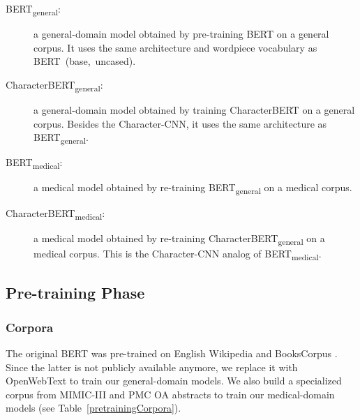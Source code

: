 \documentclass[11pt]{article}
\begin{document}
\begin{description}
    \item[BERT\textsubscript{general}:] a general-domain model obtained by pre-training BERT on a general corpus. It uses the same architecture and wordpiece vocabulary as BERT~(base,~uncased). \item[CharacterBERT\textsubscript{general}:] a general-domain model obtained by training CharacterBERT on a general corpus. Besides the Character-CNN, it uses the same architecture as BERT\textsubscript{general}. \item[BERT\textsubscript{medical}:] a medical model obtained by re-training BERT\textsubscript{general} on a medical corpus. \item[CharacterBERT\textsubscript{medical}:] a medical model obtained by re-training CharacterBERT\textsubscript{general} on a medical corpus. This is the Character-CNN analog of BERT\textsubscript{medical}.
\end{description}

\subsection{Pre-training Phase}
\subsubsection{Corpora}

The original BERT was pre-trained on English Wikipedia and BooksCorpus \cite{zhu2015aligning}. Since the latter is not publicly available anymore, we replace it with OpenWebText \cite{Gokaslan2019OpenWeb} to train our general-domain models. We also build a specialized corpus from MIMIC-III and PMC OA abstracts to train our medical-domain models (see Table~\ref{pretrainingCorpora}).

\begin{table}[htpb]
\centering
\setlength{\tabcolsep}{8pt}
\centering\caption{Statistics on pre-training corpora.}\label{pretrainingCorpora}
\end{table}
\end{document}

